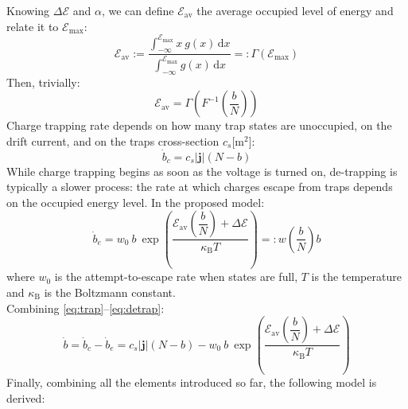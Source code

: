 \documentclass[11pt,a4paper]{article}
\begin{document}
Knowing \(\Delta \mathcal{E}\) and \(\alpha\), we can define \(\mathcal{E}_\mathrm{av}\) the average occupied level of energy and relate it to \(\mathcal{E}_{\mathrm{max}}\):
\begin{equation}
	\mathcal{E}_{\mathrm{av}} := \dfrac{\displaystyle \int_{-\infty}^{\mathcal{E}_{\mathrm{max}}} x\ g(x)\, \mathrm{d}x} {\displaystyle \int_{-\infty}^{\mathcal{E}_{\mathrm{max}}} g(x)\, \mathrm{d}x} =:
	\Gamma\left(\mathcal{E}_{\mathrm{max}}\right)
\end{equation}
Then, trivially:
\begin{equation}
	\mathcal{E}_{\mathrm{av}} = \Gamma\left(F^{-1}\left(\dfrac{b}{N}\right)\right)
\end{equation}
Charge trapping rate depends on how many trap states are unoccupied, on the drift current, and on the traps cross-section \(c_s\)[\(\mathrm{m}^2\)]:
\begin{equation}\label{eq:trap}
	\dot{b}_c = c_s|\mathbf{j}|(N-b)
\end{equation}
While charge trapping begins as soon as the voltage is turned on, de-trapping is typically a slower process: the rate at which charges escape from traps depends on the occupied energy level. In the proposed model:
\begin{equation}\label{eq:detrap}
	\dot{b}_e = w_0\ b\ \exp \left(\dfrac{\mathcal{E}_{\mathrm{av}} \left( \dfrac{b}{N}\right) + \Delta \mathcal{E}}{\kappa_\mathrm{B} T }\right) =: w\left(\dfrac{b}{N}\right)b
\end{equation}
where \(w_0\) is the attempt-to-escape rate when states are full, \(T\) is the temperature and \(\kappa_\mathrm{B}\) is the Boltzmann constant.\\
Combining \eqref{eq:trap}--\eqref{eq:detrap}:
\begin{equation}
	\dot{b} = \dot{b}_c -\dot{b}_e = c_s|\mathbf{j}|(N-b) - w_0\ b\ \exp \left(\dfrac{\mathcal{E}_{\mathrm{av}} \left( \dfrac{b}{N}\right) + 
		\Delta \mathcal{E}}{\kappa_\mathrm{B} T }\right)
\end{equation}
Finally, combining all the elements introduced so far, the following model is derived:
\end{document}
